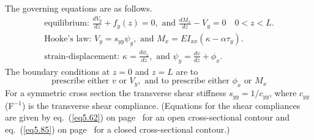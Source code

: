 \documentclass{AeroStructure-ERJohnson}
\begin{document}
The governing equations are as follows.
\begin{gather}
\textrm{equilibrium: } \frac{d V_{y}}{d z}+f_{y}(z)=0, \textrm{ and } \frac{d M_{x}}{d z}-V_{y}=0\quad 0<z<L. \label{eq17.51}\\
\textrm{Hooke's law: } V_{y}=s_{y y} \psi_{y}, \textrm{ and } M_{x}=E I_{x x}\left(\kappa-\alpha \tau_{y}\right). \label{eq17.52}\\
\textrm{strain-displacement: } \kappa=\frac{d \phi_{x}}{d z}, \textrm{ and } \psi_{y}=\frac{d v}{d z}+\phi_{x}. \label{eq17.53}
\end{gather}
The boundary conditions at $z=0$ and $z=L$ are to
\begin{equation}
\textrm{prescribe either } v \textrm{ or } V_{y}, \textrm{ and to prescribe either } \phi_{x} \textrm{ or } M_{x}\label{eq17.54}
\end{equation}
For a symmetric cross section the transverse shear stiffness $s_{y y}=1/c_{y y}$, where $c_{y y}$ (F$^{-1}$) is the transverse shear compliance. (Equations for the shear compliances are given by eq.~(\ref{eq5.62}) on page~\pageref{eq5.62} for an open cross-sectional contour and eq.~(\ref{eq5.85}) on page~\pageref{eq5.85} for a closed cross-sectional contour.)
\end{document}
